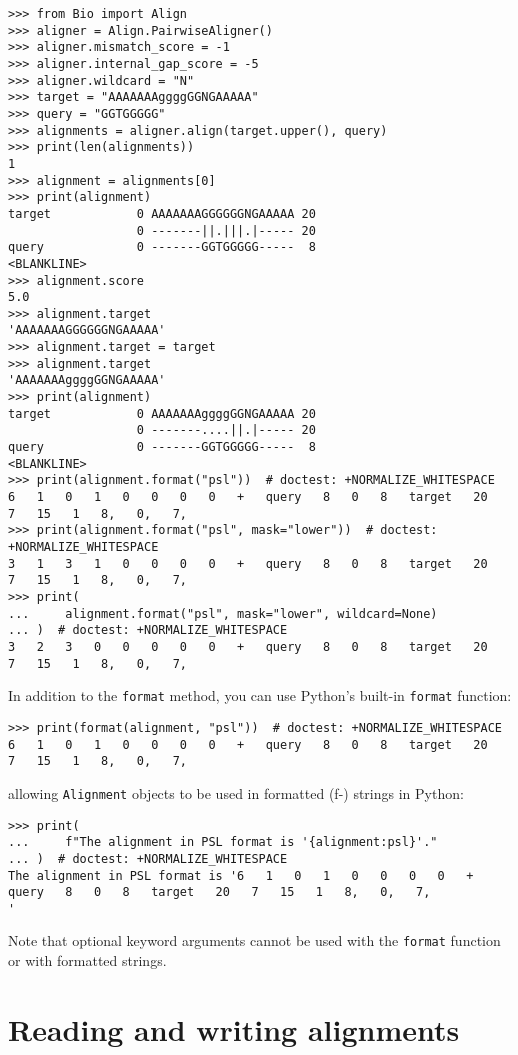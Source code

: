 \begin{itemize}
\begin{verbatim}
>>> from Bio import Align
>>> aligner = Align.PairwiseAligner()
>>> aligner.mismatch_score = -1
>>> aligner.internal_gap_score = -5
>>> aligner.wildcard = "N"
>>> target = "AAAAAAAggggGGNGAAAAA"
>>> query = "GGTGGGGG"
>>> alignments = aligner.align(target.upper(), query)
>>> print(len(alignments))
1
>>> alignment = alignments[0]
>>> print(alignment)
target            0 AAAAAAAGGGGGGNGAAAAA 20
                  0 -------||.|||.|----- 20
query             0 -------GGTGGGGG-----  8
<BLANKLINE>
>>> alignment.score
5.0
>>> alignment.target
'AAAAAAAGGGGGGNGAAAAA'
>>> alignment.target = target
>>> alignment.target
'AAAAAAAggggGGNGAAAAA'
>>> print(alignment)
target            0 AAAAAAAggggGGNGAAAAA 20
                  0 -------....||.|----- 20
query             0 -------GGTGGGGG-----  8
<BLANKLINE>
>>> print(alignment.format("psl"))  # doctest: +NORMALIZE_WHITESPACE
6   1   0   1   0   0   0   0   +   query   8   0   8   target   20   7   15   1   8,   0,   7,
>>> print(alignment.format("psl", mask="lower"))  # doctest: +NORMALIZE_WHITESPACE
3   1   3   1   0   0   0   0   +   query   8   0   8   target   20   7   15   1   8,   0,   7,
>>> print(
...     alignment.format("psl", mask="lower", wildcard=None)
... )  # doctest: +NORMALIZE_WHITESPACE
3   2   3   0   0   0   0   0   +   query   8   0   8   target   20   7   15   1   8,   0,   7,
\end{verbatim}
\end{itemize}

In addition to the \verb+format+ method, you can use Python's built-in \verb+format+ function:
\begin{verbatim}
>>> print(format(alignment, "psl"))  # doctest: +NORMALIZE_WHITESPACE
6   1   0   1   0   0   0   0   +   query   8   0   8   target   20   7   15   1   8,   0,   7,
\end{verbatim}
allowing \verb+Alignment+ objects to be used in formatted (f-) strings in Python:
\begin{verbatim}
>>> print(
...     f"The alignment in PSL format is '{alignment:psl}'."
... )  # doctest: +NORMALIZE_WHITESPACE
The alignment in PSL format is '6   1   0   1   0   0   0   0   +   query   8   0   8   target   20   7   15   1   8,   0,   7,
'
\end{verbatim}
Note that optional keyword arguments cannot be used with the \verb+format+ function or with formatted strings.

\section{Reading and writing alignments}

